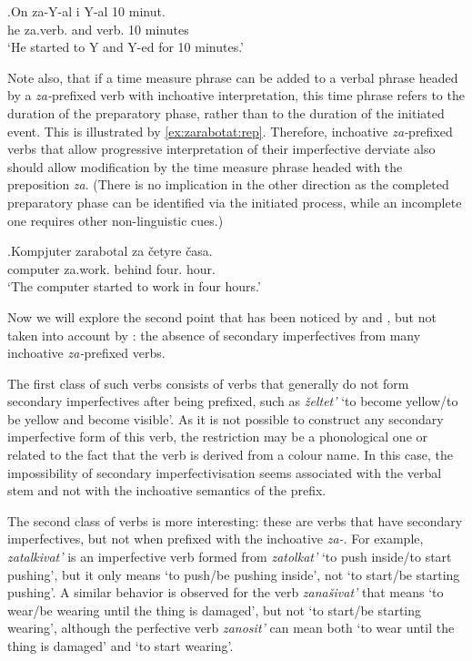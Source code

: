 \exg.\label{context:za:inch}On za-Y-al i Y-al 10 minut.\\
he za.verb. and verb. 10 minutes\\
\trans `He started to Y and Y-ed for 10 minutes.'

Note also, that if a time measure phrase can be added to a verbal phrase headed by a \textit{za-}prefixed verb with inchoative interpretation, this time phrase refers to the duration of the preparatory phase, rather than to the duration of the initiated event. This is illustrated by \ref{ex:zarabotat:rep}. Therefore, inchoative \textit{za-}prefixed verbs that allow progressive interpretation of their imperfective derviate also should allow modification by the time measure phrase headed with the preposition \textit{za}. (There is no implication in the other direction as the completed preparatory phase can be identified via the initiated process, while an incomplete one requires other non-linguistic cues.)

\exg.\label{ex:zarabotat:rep}Kompjuter zarabotal za \v{c}etyre \v{c}asa.\\
computer za.work. behind four. hour.\\
\trans `The computer started to work in four hours.'

Now we will explore the second point that has been noticed by \citet{Svenonius:04b} and \citet{Braginsky:08}, but not taken into account by \citet{Tatevosov:09}: the absence of secondary imperfectives from many inchoative \textit{za-}prefixed verbs. 

The first class of such verbs consists of verbs that generally do not form secondary imperfectives after being prefixed, such as \textit{\v{z}eltet'} `to become yellow/to be yellow and become visible'. As it is not possible to construct any secondary imperfective form of this verb, the restriction may be a phonological one or related to the fact that the verb is derived from a colour name. In this case, the impossibility of secondary imperfectivisation seems associated with the verbal stem and not with the inchoative semantics of the prefix. 

The second class of verbs is more interesting: these are verbs that have secondary imperfectives, but not when prefixed with the inchoative \textit{za-}. For example, \textit{zatalkivat'} is an imperfective verb formed from \textit{zatolkat'} `to push inside/to start pushing', but it only means `to push/be pushing inside', not `to start/be starting pushing'. A similar behavior is observed for the verb \textit{zana\v{s}ivat'} that means `to wear/be wearing until the thing is damaged', but not `to start/be starting wearing', although the perfective verb \textit{zanosit'} can mean both `to wear until the thing is damaged' and `to start wearing'.

